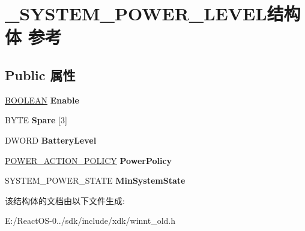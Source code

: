 \hypertarget{struct___s_y_s_t_e_m___p_o_w_e_r___l_e_v_e_l}{}\section{\+\_\+\+S\+Y\+S\+T\+E\+M\+\_\+\+P\+O\+W\+E\+R\+\_\+\+L\+E\+V\+E\+L结构体 参考}
\label{struct___s_y_s_t_e_m___p_o_w_e_r___l_e_v_e_l}
\subsection*{Public 属性}
\begin{DoxyCompactItemize}
\item 
\mbox{\label{struct___s_y_s_t_e_m___p_o_w_e_r___l_e_v_e_l_a86315f473460c84b92ebe78cd864834f}} 
\hyperlink{_processor_bind_8h_a112e3146cb38b6ee95e64d85842e380a}{B\+O\+O\+L\+E\+AN} {\bfseries Enable}
\item 
\mbox{\label{struct___s_y_s_t_e_m___p_o_w_e_r___l_e_v_e_l_ab7d39b22ca883156bd5e563fef7b41fc}} 
B\+Y\+TE {\bfseries Spare} \mbox{[}3\mbox{]}
\item 
\mbox{\label{struct___s_y_s_t_e_m___p_o_w_e_r___l_e_v_e_l_a1b8fd8d7d57020cce356f974a7502923}} 
D\+W\+O\+RD {\bfseries Battery\+Level}
\item 
\mbox{\label{struct___s_y_s_t_e_m___p_o_w_e_r___l_e_v_e_l_ad94c894c98979fca74edf9f9766a00a3}} 
\hyperlink{struct___p_o_w_e_r___a_c_t_i_o_n___p_o_l_i_c_y}{P\+O\+W\+E\+R\+\_\+\+A\+C\+T\+I\+O\+N\+\_\+\+P\+O\+L\+I\+CY} {\bfseries Power\+Policy}
\item 
\mbox{\label{struct___s_y_s_t_e_m___p_o_w_e_r___l_e_v_e_l_a507f9c81925b0dea79311a67225d42d3}} 
S\+Y\+S\+T\+E\+M\+\_\+\+P\+O\+W\+E\+R\+\_\+\+S\+T\+A\+TE {\bfseries Min\+System\+State}
\end{DoxyCompactItemize}


该结构体的文档由以下文件生成\+:\begin{DoxyCompactItemize}
\item 
E\+:/\+React\+O\+S-\/0../sdk/include/xdk/winnt\+\_\+old.\+h\end{DoxyCompactItemize}
